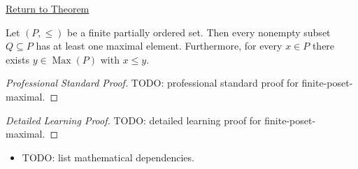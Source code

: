 \newpage
{}
\label{prf:finite-poset-maximal}

\begin{remark*}[Return]
\hyperref[prop:finite-poset-maximal]{Return to Theorem}
\end{remark*}

\begin{proposition*}
Let $(P, \leq)$ be a finite partially ordered set.  Then every nonempty
subset $Q \subseteq P$ has at least one maximal element.  Furthermore,
for every $x \in P$ there exists $y \in \operatorname{Max}(P)$ with
$x \leq y$.
\end{proposition*}

\begin{proof}[Professional Standard Proof]
\LRAProofBodyStart
TODO: professional standard proof for finite-poset-maximal.
\end{proof}

\begin{proof}[Detailed Learning Proof]
\LRAProofBodyStart
TODO: detailed learning proof for finite-poset-maximal.
\end{proof}

\begin{remark*}
\end{remark*}

\begin{dependencies}
\begin{itemize}
  \item TODO: list mathematical dependencies.
\end{itemize}
\end{dependencies}

\clearpage
